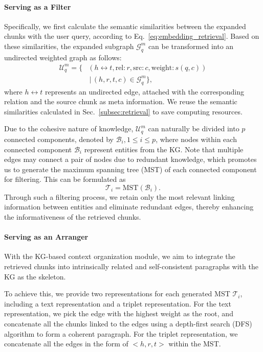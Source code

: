 \paragraph{Serving as a Filter}
Specifically, we first calculate the semantic similarities between the expanded chunks with the user query, according to Eq.~\eqref{eq:embedding_retrieval}. Based on these similarities, the expanded subgraph $\mathcal{G}_q^m$ can be transformed into an undirected weighted graph as follows:
\begin{equation}
\label{eq:undirect_graph}
\begin{aligned}
\mathcal{U}_q^m=\{&(h\leftrightarrow t, \text{rel}:r, \text{src}:c, \text{weight}:s(q,c))\\
&\,|\,(h,r,t,c)\in\mathcal{G}_q^m\},
\end{aligned}
\end{equation}
where $h\leftrightarrow t$ represents an undirected edge, attached with the corresponding relation and the source chunk as meta information.
We reuse the semantic similarities calculated in Sec.~\ref{subsec:retrieval} to save computing resources.

Due to the cohesive nature of knowledge, $\mathcal{U}_q^m$ can naturally be divided into $p$ connected components, denoted by $\mathcal{B}_i,1\leq i\leq p$, where nodes within each connected component $\mathcal{B}_i$ represent entities from the KG. Note that multiple edges may connect a pair of nodes due to redundant knowledge, which promotes us to generate the maximum spanning tree (MST) of each connected component for filtering. This can be formulated as
\begin{equation}
\label{eq:mst}
\mathcal{T}_i = \text{MST}(\mathcal{B}_i).
\end{equation}
Through such a filtering process, we retain only the most relevant linking information between entities and eliminate redundant edges, thereby enhancing the informativeness of the retrieved chunks.

\paragraph{Serving as an Arranger}
With the KG-based context organization module, we aim to integrate the retrieved chunks into intrinsically related and self-consistent paragraphs with the KG as the skeleton.

To achieve this, we provide two representations for each generated MST $\mathcal{T}_i$, including a text representation and a triplet representation. For the text representation, we pick the edge with the highest weight as the root, and concatenate all the chunks linked to the edges using a depth-first search (DFS) algorithm to form a coherent paragraph. For the triplet representation, we concatenate all the edges in the form of $<h,r,t>$ within the MST.

